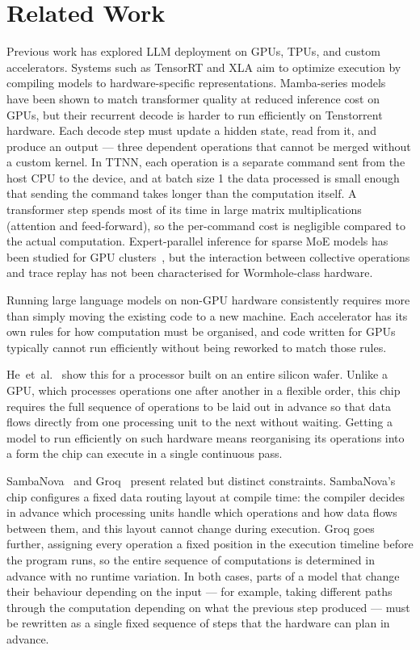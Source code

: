 \section{Related Work}

Previous work has explored LLM deployment on GPUs, TPUs, and custom accelerators. Systems such as TensorRT and XLA aim to optimize execution by compiling models to hardware-specific representations. Mamba-series models~\citep{gu2023mamba,dao2024transformers} have been shown to match transformer quality at reduced inference cost on GPUs, but their recurrent decode is harder to run efficiently on Tenstorrent hardware. Each decode step must update a hidden state, read from it, and produce an output — three dependent operations that cannot be merged without a custom kernel. In TTNN, each operation is a separate command sent from the host CPU to the device, and at batch size 1 the data processed is small enough that sending the command takes longer than the computation itself. A transformer step spends most of its time in large matrix multiplications (attention and feed-forward), so the per-command cost is negligible compared to the actual computation. Expert-parallel inference for sparse MoE models has been studied for GPU clusters~\citep{lepikhin2021gshard}, but the interaction between collective operations and trace replay has not been characterised for Wormhole-class hardware.

Running large language models on non-GPU hardware consistently requires more than simply moving the existing code to a new machine. Each accelerator has its own rules for how computation must be organised, and code written for GPUs typically cannot run efficiently without being reworked to match those rules.

He~et~al.~\citep{he2025waferllm} show this for a processor built on an entire silicon wafer. Unlike a GPU, which processes operations one after another in a flexible order, this chip requires the full sequence of operations to be laid out in advance so that data flows directly from one processing unit to the next without waiting. Getting a model to run efficiently on such hardware means reorganising its operations into a form the chip can execute in a single continuous pass.

SambaNova~\citep{sambanova2025dataflow} and Groq~\citep{groq2025lpu} present related but distinct constraints. SambaNova's chip configures a fixed data routing layout at compile time: the compiler decides in advance which processing units handle which operations and how data flows between them, and this layout cannot change during execution. Groq goes further, assigning every operation a fixed position in the execution timeline before the program runs, so the entire sequence of computations is determined in advance with no runtime variation. In both cases, parts of a model that change their behaviour depending on the input --- for example, taking different paths through the computation depending on what the previous step produced --- must be rewritten as a single fixed sequence of steps that the hardware can plan in advance.

